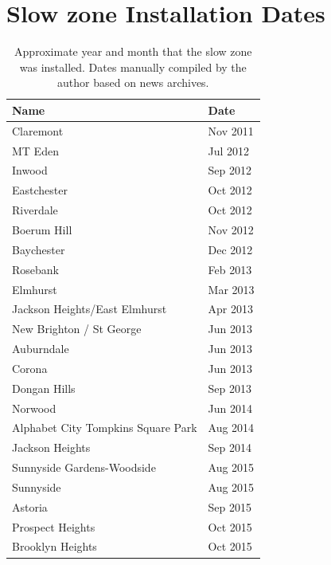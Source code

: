 \documentclass[10pt,journal,compsoc]{IEEEtran}
\begin{document}
\section{Slow zone  Installation Dates}
\label{sec:appendixa}
\begin{table}[H]
\centering

\caption*{Approximate year and month that the slow zone  was installed.  Dates manually compiled by the author based on news archives. }

\begin{tabular}{|l|l|}
\hline
                                  Name &  Date \\ \hline
                          Claremont &  Nov 2011 \\ \hline
                            MT Eden &  Jul 2012 \\ \hline
                             Inwood &  Sep 2012 \\ \hline
                        Eastchester &  Oct 2012 \\ \hline
                          Riverdale &  Oct 2012 \\ \hline
                        Boerum Hill &  Nov 2012 \\ \hline
                         Baychester &  Dec 2012 \\ \hline
                           Rosebank &  Feb 2013 \\ \hline
                           Elmhurst &  Mar 2013 \\ \hline
      Jackson Heights/East Elmhurst &  Apr 2013 \\ \hline
           New Brighton / St George &  Jun 2013 \\ \hline
                         Auburndale &  Jun 2013 \\ \hline
                             Corona &  Jun 2013 \\ \hline
                       Dongan Hills &  Sep 2013 \\ \hline
                           Norwood &  Jun 2014 \\ \hline
 Alphabet City Tompkins Square Park &  Aug 2014 \\ \hline
                    Jackson Heights &  Sep 2014 \\ \hline
         Sunnyside Gardens-Woodside &  Aug 2015 \\ \hline
                          Sunnyside &  Aug 2015 \\ \hline
                            Astoria &  Sep 2015 \\ \hline
                   Prospect Heights &  Oct 2015 \\ \hline
                   Brooklyn Heights &  Oct 2015 \\ \hline
\end{tabular}
\end{table}
\end{document}
